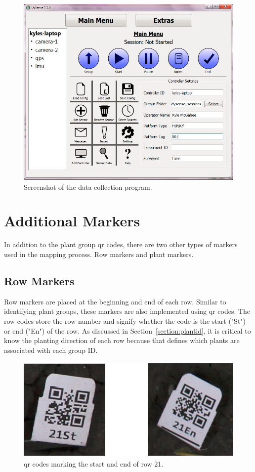 \begin{figure}
	\centering
    \includegraphics[width=6in]{figures/dysense2.jpg}
    \caption[Data collection program]{Screenshot of the data collection program.}
    \label{dysense_screenshot}
\end{figure}

\section{Additional Markers}
\label{system-markers}

In addition to the plant group \ac{qr} codes, there are two other types of markers used in the mapping process. Row markers and plant markers.   

\subsection{Row Markers}

Row markers are placed at the beginning and end of each row. Similar to identifying plant groups, these markers are also implemented using \ac{qr} codes.  The row codes store the row number and signify whether the code is the start ("St") or end ("En") of the row. As discussed in Section~\ref{section:plantid}, it is critical to know the planting direction of each row because that defines which plants are associated with each group ID.

\begin{figure}
	\centering
    \includegraphics[height=2in]{figures/row_codes.jpg}
    \caption[Row QR codes]{\ac{qr} codes marking the start and end of row 21.}
    \label{figure:row_codes}
\end{figure}

